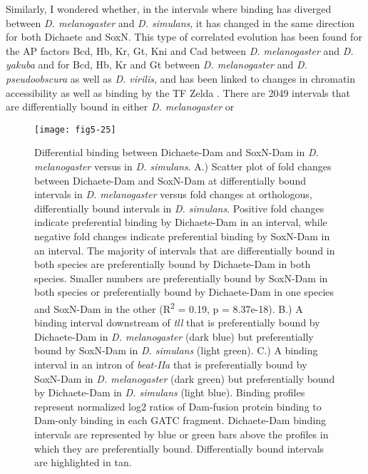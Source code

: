 Similarly, I wondered whether, in the intervals where binding has diverged between \emph{D. melanogaster} and \emph{D. simulans}, it has changed in the same direction for both Dichaete and SoxN. This type of correlated evolution has been found for the AP factors Bcd, Hb, Kr, Gt, Kni and Cad between \emph{D. melanogaster} and \emph{D. yakuba} and for Bcd, Hb, Kr and Gt between \emph{D. melanogaster} and \emph{D. pseudoobscura} as well as \emph{D. virilis}, and has been linked to changes in chromatin accessibility as well as binding by the TF Zelda \citep{bradley_binding_2010,paris_extensive_2013}. There are 2049 intervals that are differentially bound in either \emph{D. melanogaster} or 

\begin{figure}[H]
\centering
\texttt{[image: fig5-25]}
\caption[Differential binding between Dichaete-Dam and SoxN-Dam in \emph{D. melanogaster} versus in \emph{D. simulans}]{Differential binding between Dichaete-Dam and SoxN-Dam in \emph{D. melanogaster} versus in \emph{D. simulans}. A.) Scatter plot of fold changes between Dichaete-Dam and SoxN-Dam at differentially bound intervals in \emph{D. melanogaster} versus fold changes at orthologous, differentially bound intervals in \emph{D. simulans}. Positive fold changes indicate preferential binding by Dichaete-Dam in an interval, while negative fold changes indicate preferential binding by SoxN-Dam in an interval. The majority of intervals that are differentially bound in both species are preferentially bound by Dichaete-Dam in both species. Smaller numbers are preferentially bound by SoxN-Dam in both species or preferentially bound by Dichaete-Dam in one species and SoxN-Dam in the other (R\textsuperscript{2} = 0.19, p = 8.37e-18). B.) A binding interval downstream of \emph{tll} that is preferentially bound by Dichaete-Dam in \emph{D. melanogaster} (dark blue) but preferentially bound by SoxN-Dam in \emph{D. simulans} (light green). C.) A binding interval in an intron of \emph{beat-IIa} that is preferentially bound by SoxN-Dam in \emph{D. melanogaster} (dark green) but preferentially bound by Dichaete-Dam in \emph{D. simulans} (light blue). Binding profiles represent normalized log2 ratios of Dam-fusion protein binding to Dam-only binding in each GATC fragment. Dichaete-Dam binding intervals are represented by blue or green bars above the profiles in which they are preferentially bound. Differentially bound intervals are highlighted in tan.}
\label{Figure 5.25}
\end{figure}


